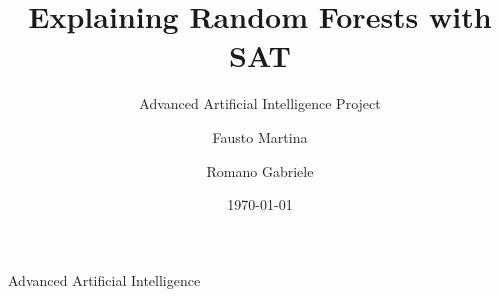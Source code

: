 \documentclass{beamer}
\theoremstyle{plain}
\begin{document}
\title[Explaining RF]{Explaining Random Forests with SAT}
\subtitle{Advanced Artificial Intelligence Project}
\author[Fausto, Romano]{Fausto Martina \and Romano Gabriele}
\date{\today}

\begin{frame}{Advanced Artificial Intelligence}
  \titlepage
\end{frame}








\end{document}
